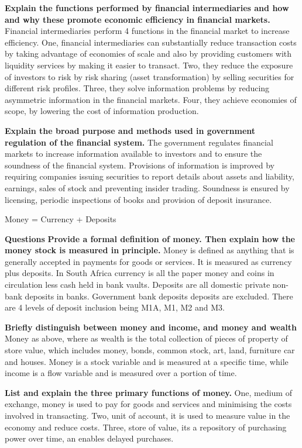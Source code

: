 \documentclass[12pt]{examnotes}
\begin{document}
\textbf{Explain the functions performed by financial intermediaries and how and why these promote economic efficiency in financial markets.}
Financial intermediaries perform 4 functions in the financial market to increase efficiency. One, financial intermediaries can substantially reduce transaction costs by taking advantage of economies of scale and also by providing customers with liquidity services by making it easier to transact. Two, they reduce the exposure of investors to risk by risk sharing (asset transformation) by selling securities for different risk profiles. Three, they solve information problems by reducing asymmetric information in the financial markets. Four, they achieve economies of scope, by lowering the cost of information production.

\textbf{Explain the broad purpose and methods used in government regulation of the financial system.}
The government regulates financial markets to increase information available to investors and to ensure the soundness of the financial system. Provisions of information is improved by requiring companies issuing securities to report details about assets and liability, earnings, sales of stock and preventing insider trading. Soundness is ensured by licensing, periodic inspections of books and provision of deposit insurance.



Money = Currency + Deposits

\textbf{Questions}
\textbf{Provide a formal definition of money. Then explain how the money stock is measured in principle.}
Money is defined as anything that is generally accepted in payments for goods or services. It is measured as currency plus deposits. In South Africa currency is all the paper money and coins in circulation less cash held in bank vaults. Deposits are all domestic private non-bank deposits in banks. Government bank deposits deposits are excluded. There are 4 levels of deposit inclusion being M1A, M1, M2 and M3.

\textbf{Briefly distinguish between money and income, and money and wealth}
Money as above, where as wealth is the total collection of pieces of property of store value, which includes money, bonds, common stock, art, land, furniture car and houses. Money is a stock variable and is measured at a specific time, while income is a flow variable and is measured over a portion of time.

\textbf{List and explain the three primary functions of money.}
One, medium of exchange, money is used to pay for goods and services and minimising the costs involved in transacting. Two, unit of account, it is used to measure value in the economy and reduce costs. Three, store of value, its a repository of purchasing power over time, an enables delayed purchases.
\end{document}
